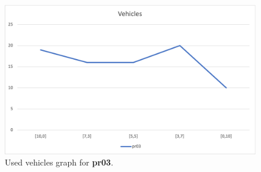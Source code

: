 \begin{figure}[H]
    \centering
    \includegraphics[height=0.25\textheight]{../graphs/pr03-vehicles.png}
    \caption{Used vehicles graph for \textbf{pr03}.}
\end{figure}

\newpage